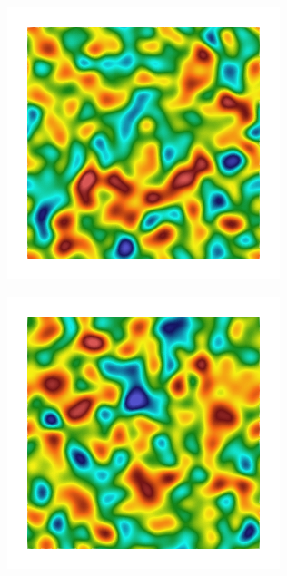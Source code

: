\begin{figure}[!htb]
  \begin{subfigure}[b]{0.15\textwidth}
    \includegraphics[width=\textwidth]{Chapter4/figures/2D/Gc_sqexp_cartesian_5_5_rho_0_seed_d.png}
    \caption{}
    \label{fig: Chapter4/2D/Gc_sqexp_cartesian_5_5_rho_0_seed_d}
  \end{subfigure}
  \begin{subfigure}[b]{0.15\textwidth}
    \includegraphics[width=\textwidth]{Chapter4/figures/2D/psic_sqexp_cartesian_5_5_rho_0_seed_d.png}

\end{subfigure}
\end{figure}
